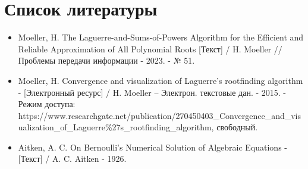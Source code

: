 \documentclass[a4paper,12pt]{article}
\begin{document}
\section{Список литературы}
\begin{itemize}
    \item Moeller, H. The Laguerre-and-Sums-of-Powers Algorithm for the Efficient and Reliable Approximation of All Polynomial Roots [Текст] / H. Moeller // Проблемы передачи информации - 2023. - № 51.
    \item Moeller, H. Convergence and visualization of Laguerre's rootfinding algorithm - [Электронный ресурс] / H. Moeller – Электрон. текстовые дан. - 2015. - Режим доступа: \\https://www.researchgate.net/publication/270450403\_Convergence\_and\_visualization\_of\_Laguerre\%27s\_rootfinding\_algorithm, свободный.
    \item Aitken, A. C. On Bernoulli's Numerical Solution of Algebraic Equations - [Текст] / A. C. Aitken - 1926.
\end{itemize}
\end{document}
